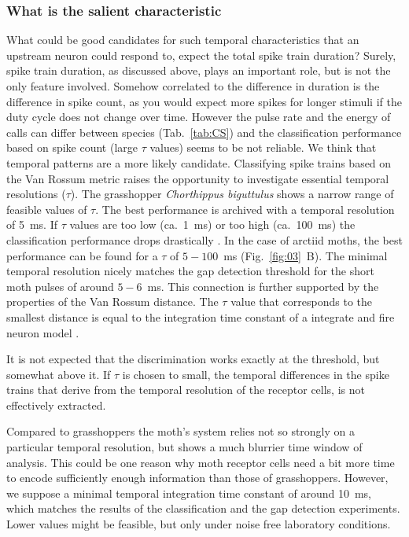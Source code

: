 \documentclass[12pt,a4paper]{article}
\newcommand{\species}[1]{\textit{#1}}
\newcommand{\fig}[2]{(Fig.~#1~#2)}
\begin{document}
\subsubsection{What is the salient characteristic}
What could be good candidates for such temporal characteristics that an upstream neuron could respond to, expect the total spike train duration? Surely, spike train duration, as discussed above, plays an important role, but is not the only feature involved. Somehow correlated to the difference in duration is the difference in spike count, as you would expect more spikes for longer stimuli if the duty cycle does not change over time. However the pulse rate and the energy of calls can differ between species (Tab.~\ref{tab:CS}) and the classification performance based on spike count (large $\tau$ values) seems to be not reliable. We think that temporal patterns are a more likely candidate. Classifying spike trains based on the Van Rossum metric raises the opportunity to investigate essential temporal resolutions ($\tau$). The grasshopper \species{Chorthippus biguttulus} shows a narrow range of feasible values of $\tau$. The best performance is archived with a temporal resolution of 5~ms. If $\tau$ values are too low (ca.~1~ms) or too high (ca.~100~ms) the classification performance drops drastically \cite{machens2003}. In the case of arctiid moths, the best performance can be found for a $\tau$ of $5-100$~ms \fig{\ref{fig:03}}{B}. The minimal temporal resolution nicely matches the gap detection threshold for the short moth pulses of around $5-6$~ms. This connection is further supported by the properties of the Van Rossum distance. The $ \tau $ value that corresponds to the smallest distance is equal to the integration time constant of a integrate and fire neuron model \cite{rossum2001}. 

It is not expected that the discrimination works exactly at the threshold, but somewhat above it. If $\tau$ is chosen to small, the temporal differences in the spike trains that derive from the temporal resolution of the receptor cells, is not effectively extracted.  

Compared to grasshoppers the moth's system relies not so strongly on a particular temporal resolution, but shows a much blurrier time window of analysis. This could be one reason why moth receptor cells need a bit more time to encode sufficiently enough information than those of grasshoppers.
However, we suppose a minimal temporal integration time constant of around 10~ms, which matches the results of the classification and the gap detection experiments. Lower values might be feasible, but only under noise free laboratory conditions.
\end{document}

